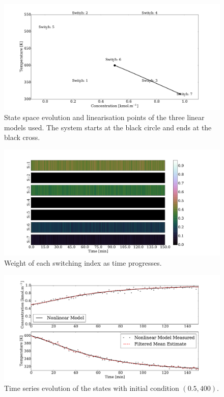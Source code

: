 \documentclass[../masters.tex]{subfiles}
\begin{document}
\begin{figure}[H] 
\centering
\includegraphics[scale=0.3]{skf_s7_s_m2.pdf}
\caption{State space evolution and linearisation points of the three linear models used. The system starts at the black circle and ends at the black cross.}
\label{fig_7mod_ss_m2}
\end{figure}
\begin{figure}[H] 
\centering
\includegraphics[scale=0.3]{skf_s7_w_m2.pdf}
\caption{Weight of each switching index as time progresses.}
\label{fig_7mod_w_m2}
\end{figure}
\begin{figure}[H] 
\centering
\includegraphics[scale=0.3]{skf_s7_t_m2.pdf}
\caption{Time series evolution of the states with initial condition $(0.5, 400)$.}
\label{fig_7mod_t_m2}
\end{figure}
\end{document}
